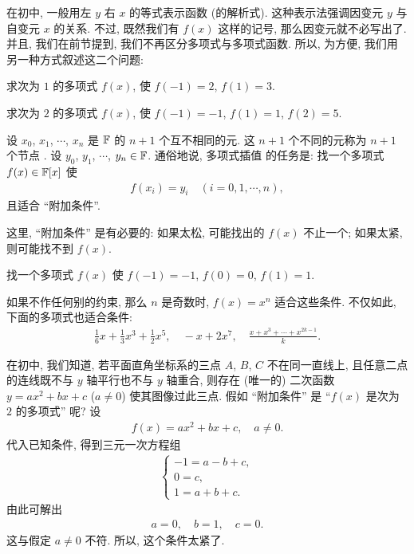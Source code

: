 在初中, 一般用左 $y$ 右 $x$ 的等式表示函数 (的解析式). 这种表示法强调因变元  $y$ 与自变元  $x$ 的关系. 不过, 既然我们有 $f(x)$ 这样的记号, 那么因变元就不必写出了. 并且, 我们在前节提到, 我们不再区分多项式与多项式函数. 所以, 为方便, 我们用另一种方式叙述这二个问题:

\begin{example}
    求次为 $1$ 的多项式 $f(x)$, 使 $f(-1)=2$, $f(1)=3$.
\end{example}

\begin{example}
    求次为 $2$ 的多项式 $f(x)$, 使 $f(-1)=-1$, $f(1)=1$, $f(2)=5$.
\end{example}

设 $x_0$, $x_1$, $\cdots$, $x_{n}$ 是 $\mathbb{F}$ 的 $n+1$ 个互不相同的元. 这 $n+1$ 个不同的元称为 $n+1$ 个节点 . 设 $y_0$, $y_1$, $\cdots$, $y_{n} \in \mathbb{F}$. 通俗地说, 多项式插值  的任务是: 找一个多项式 $f(x) \in \mathbb{F}[x]$ 使
\begin{align*}
    f(x_i) = y_i \quad (i = 0,1,\cdots,n),
\end{align*}
且适合 ``附加条件''.

这里, ``附加条件'' 是有必要的: 如果太松, 可能找出的 $f(x)$ 不止一个; 如果太紧, 则可能找不到 $f(x)$.

\begin{example}
    找一个多项式 $f(x)$ 使 $f(-1)=-1$, $f(0)=0$, $f(1)=1$.

    如果不作任何别的约束, 那么 $n$ 是奇数时, $f(x) = x^n$ 适合这些条件. 不仅如此, 下面的多项式也适合条件:
    \begin{align*}
        \frac{1}{6}x + \frac{1}{3}x^3 + \frac{1}{2}x^5, \quad -x + 2x^7, \quad \frac{x + x^3 + \cdots + x^{2k-1}}{k}.
    \end{align*}

    在初中, 我们知道, 若平面直角坐标系的三点 $A$, $B$, $C$ 不在同一直线上, 且任意二点的连线既不与 $y$ 轴平行也不与 $y$ 轴重合, 则存在 (唯一的) 二次函数 $y = ax^2 + bx + c$ ($a \neq 0$) 使其图像过此三点. 假如 ``附加条件'' 是 ``$f(x)$ 是次为 $2$ 的多项式'' 呢? 设
    \begin{align*}
        f(x) = ax^2 + bx + c, \quad a \neq 0.
    \end{align*}
    代入已知条件, 得到三元一次方程组
    \begin{align*}
        \begin{cases}
            -1 = a - b + c, \\
            0 = c,          \\
            1 = a + b + c.
        \end{cases}
    \end{align*}
    由此可解出
    \begin{align*}
        a = 0, \quad b = 1, \quad c = 0.
    \end{align*}
    这与假定 $a \neq 0$ 不符. 所以, 这个条件太紧了.
\end{example}

